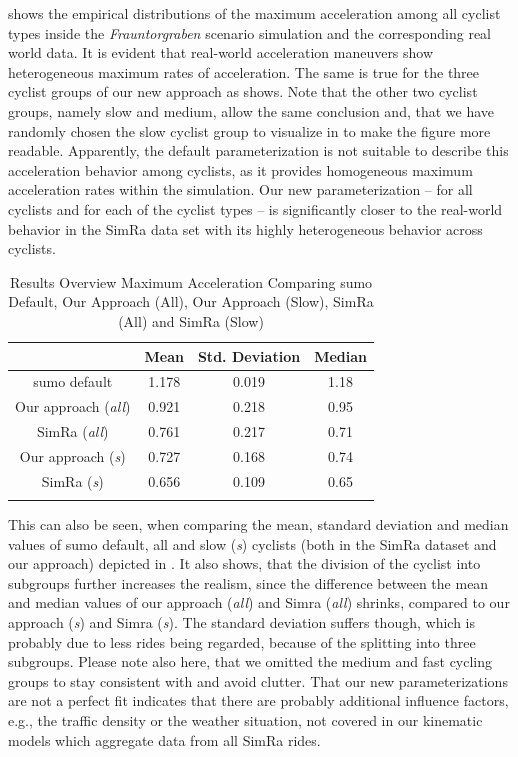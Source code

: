  shows the empirical distributions of the maximum acceleration among all cyclist types inside the \textit{Frauntorgraben} scenario simulation and the corresponding real world data.
It is evident that real-world acceleration maneuvers show heterogeneous maximum rates of acceleration.
The same is true for the three cyclist groups of our new approach as  shows.
Note that the other two cyclist groups, namely slow and medium, allow the same conclusion and, that we have randomly chosen the slow cyclist group to visualize in  to make the figure more readable.
Apparently, the default parameterization is not suitable to describe this acceleration behavior among cyclists, as it provides homogeneous maximum acceleration rates within the simulation.
Our new parameterization -- for all cyclists and for each of the cyclist types -- is significantly closer to the real-world behavior in the SimRa data set with its highly heterogeneous behavior across cyclists.
\begin{table}
\centering
\caption{Results Overview Maximum Acceleration Comparing \ac{sumo} Default, Our Approach (All), Our Approach (Slow), SimRa (All) and SimRa (Slow)}%
\label{tab:results_overview_acc}
\begin{tabular}{cccc}
\toprule
& Mean & Std. Deviation & Median\\
\midrule
\midrule
\ac{sumo} default & \num{1.178} & \num{0.019} & \num{1.18} \\
\midrule
Our approach (\textit{all}) & \num{0.921} & \num{0.218} & \num{0.95} \\
SimRa (\textit{all}) & \num{0.761} & \num{0.217} & \num{0.71} \\
\midrule
Our approach (\textit{s}) & \num{0.727} & \num{0.168} & \num{0.74} \\
SimRa (\textit{s}) & \num{0.656} & \num{0.109} & \num{0.65} \\
\bottomrule&
\end{tabular}
\end{table}
This can also be seen, when comparing the mean, standard deviation and median values of \ac{sumo} default, all and slow (\textit{s}) cyclists (both in the SimRa dataset and our approach) depicted in .
It also shows, that the division of the cyclist into subgroups further increases the realism, since the difference between the mean and median values of our approach (\textit{all}) and Simra (\textit{all}) shrinks, compared to our approach (\textit{s}) and Simra (\textit{s}).
The standard deviation suffers though, which is probably due to less rides being regarded, because of the splitting into three subgroups.
Please note also here, that we omitted the medium and fast cycling groups to stay consistent with  and avoid clutter.
That our new parameterizations are not a perfect fit indicates that there are probably additional influence factors, e.g., the traffic density or the weather situation, not covered in our kinematic models which aggregate data from all SimRa rides.

